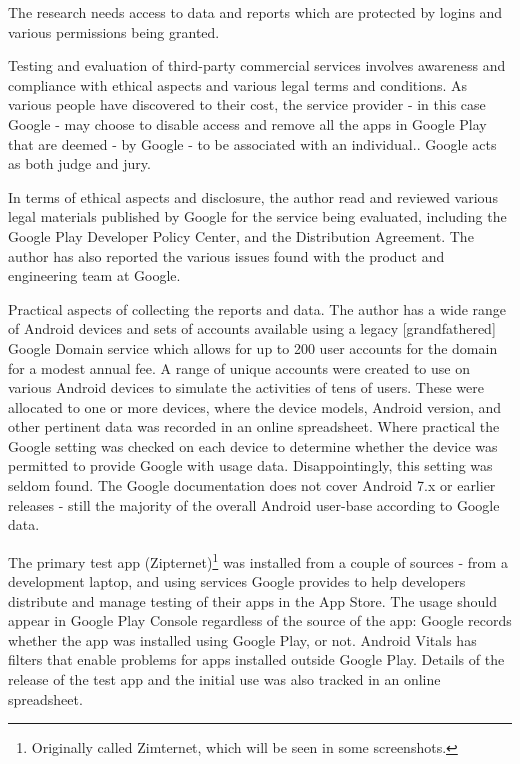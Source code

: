 The research needs access to data and reports which are protected by logins and various permissions being granted. 

Testing and evaluation of third-party commercial services involves awareness and compliance with ethical aspects and various legal terms and conditions. As various people have discovered to their cost, the service provider - in this case Google - may choose to disable access and remove all the apps in Google Play that are deemed - by Google - to be associated with an individual.\cite{martinez2019_google_just_terminated_our_startup_google_play_publisher_account_on_xmas_day}. Google acts as both judge and jury.

In terms of ethical aspects and disclosure, the author read and reviewed various legal materials published by Google for the service being evaluated, including the Google Play Developer Policy Center\cite{google_play_developer_policy_center}, and the Distribution Agreement\cite{google_play_developer_distribution_agreement}. The author has also reported the various issues found with the product and engineering team at Google.

Practical aspects of collecting the reports and data. The author has a wide range of Android devices and sets of accounts available using a legacy [grandfathered] Google Domain service which allows for up to 200 user accounts for the domain for a modest annual fee. A range of unique accounts were created to use on various Android devices to simulate the activities of tens of users. These were allocated to one or more devices, where the device models, Android version, and other pertinent data was recorded in an online spreadsheet. Where practical the Google setting was checked on each device to determine whether the device was permitted to provide Google with usage data. Disappointingly, this setting was seldom found. The Google documentation does not cover Android 7.x or earlier releases - still the majority of the overall Android user-base according to Google data\cite{android_dashboard}. 

The primary test app (Zipternet)\footnote{Originally called Zimternet, which will be seen in some screenshots.} was installed from a couple of sources - from a development laptop, and using services Google provides to help developers distribute and manage testing of their apps in the App Store. The usage should appear in Google Play Console regardless of the source of the app: Google records whether the app was installed using Google Play, or not. Android Vitals has filters that enable problems for apps installed outside Google Play. Details of the release of the test app and the initial use was also tracked in an online spreadsheet. 

